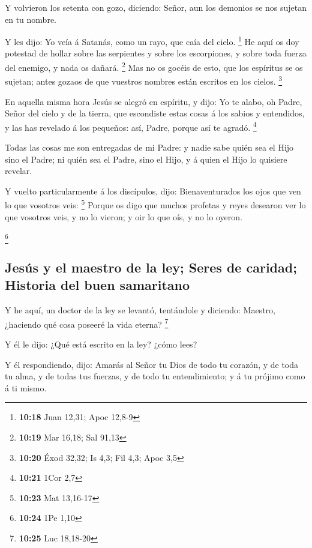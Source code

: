  Y volvieron los setenta con gozo, diciendo: Señor, aun
los demonios se nos sujetan en tu nombre.

 Y les dijo: Yo veía á Satanás, como un rayo, que caía
del cielo. \footnote{\textbf{10:18} Juan 12,31; Apoc 12,8-9}
 He aquí os doy potestad de hollar sobre las serpientes y
sobre los escorpiones, y sobre toda fuerza del enemigo, y nada os
dañará. \footnote{\textbf{10:19} Mar 16,18; Sal 91,13} 
Mas no os gocéis de esto, que los espíritus se os sujetan; antes gozaos
de que vuestros nombres están escritos en los cielos. \footnote{\textbf{10:20}
  Éxod 32,32; Is 4,3; Fil 4,3; Apoc 3,5}

 En aquella misma hora Jesús se alegró en espíritu, y
dijo: Yo te alabo, oh Padre, Señor del cielo y de la tierra, que
escondiste estas cosas á los sabios y entendidos, y las has revelado á
los pequeños: así, Padre, porque así te agradó. \footnote{\textbf{10:21}
  1Cor 2,7}

 Todas las cosas me son entregadas de mi Padre: y nadie
sabe quién sea el Hijo sino el Padre; ni quién sea el Padre, sino el
Hijo, y á quien el Hijo lo quisiere revelar.

 Y vuelto particularmente á los discípulos, dijo:
Bienaventurados los ojos que ven lo que vosotros veis: \footnote{\textbf{10:23}
  Mat 13,16-17}  Porque os digo que muchos profetas y
reyes desearon ver lo que vosotros veis, y no lo vieron; y oir lo que
oís, y no lo oyeron.

\footnote{\textbf{10:24} 1Pe 1,10}

\hypertarget{jesuxfas-y-el-maestro-de-la-ley-seres-de-caridad-historia-del-buen-samaritano}{%
\subsection{Jesús y el maestro de la ley; Seres de caridad; Historia del
buen
samaritano}\label{jesuxfas-y-el-maestro-de-la-ley-seres-de-caridad-historia-del-buen-samaritano}}

 Y he aquí, un doctor de la ley se levantó, tentándole y
diciendo: Maestro, ¿haciendo qué cosa poseeré la vida eterna?
\footnote{\textbf{10:25} Luc 18,18-20}

 Y él le dijo: ¿Qué está escrito en la ley? ¿cómo lees?

 Y él respondiendo, dijo: Amarás al Señor tu Dios de todo
tu corazón, y de toda tu alma, y de todas tus fuerzas, y de todo tu
entendimiento; y á tu prójimo como á ti mismo.

